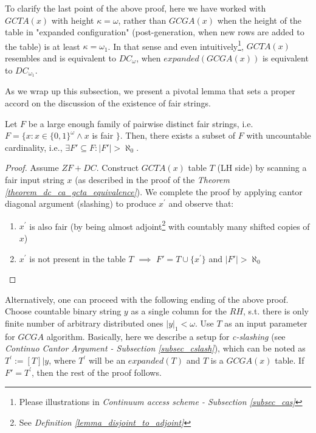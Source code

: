To clarify the last point of the above proof, here we have worked with $GCTA(x)$ with height $\kappa = \omega$, rather than $GCGA(x)$ when the height of the table in "expanded configuration" (post-generation, when new rows are added to the table) is at least $\kappa = \omega_1$. In that sense and even intuitively\footnote{Please illustrations in \textit{Continuum access scheme - Subsection \ref{subsec_cas}}}, $GCTA(x)$ resembles and is equivalent to $DC_\omega$, when $expanded(GCGA(x))$ is equivalent to $DC_{\omega_1}$.

As we wrap up this subsection, we present a pivotal lemma that sets a proper accord on the discussion of the existence of fair strings.

\begin{lemma}\label{lemma_uncountfair_seq}
  Let \( F \) be a large enough family of pairwise distinct fair strings, i.e. $F = \{x : x \in \{0,1\}^\omega 
  \land x$ is fair $\}$. Then, there exists a subset of \( F \) with uncountable cardinality, i.e., \( \exists F' \subseteq F: |F'| > \aleph_0 \).
\end{lemma}
\begin{proof}
 Assume $ZF + DC$. Construct $GCTA(x)$ table $T$ (LH side) by scanning a fair input string $x$ (as described in the proof of the \textit{Theorem \ref{theorem_dc_ca_gcta_equivalence}}). We complete the proof by applying cantor diagonal argument (slashing) to produce $x^\prime$ and observe that: 
  \begin{enumerate}
    \item $x^\prime$ is also fair (by being almost adjoint\footnote{See \textit{Definition \ref{lemma_disjoint_to_adjoint}}} with countably many shifted copies of $x$)
    \item $x^\prime$ is not present in the table $T$ $\implies$ $F' = T \cup \{x^\prime\}$ and $|F'| > \aleph_0$
  \end{enumerate}
\end{proof}

Alternatively, one can proceed with the following ending of the above proof. Choose countable binary string $y$ as a single column for the $RH$, s.t. there is only finite number of arbitrary distributed ones $|y|_1 < \omega$. Use $T$ as an input parameter for $GCGA$ algorithm. Basically, here we describe a setup for \textit{c-slashing} (see \textit{Continuo Cantor Argument - Subsection \ref{subsec_cslash}}), which can be noted as $T^\prime := [T]|y$, where $T^\prime$ will be an $expanded(T)$ and $T$ is a $GCGA(x)$ table. If $F' = T^\prime$, then the rest of the proof follows. 

